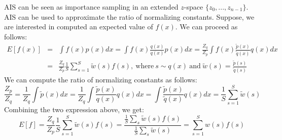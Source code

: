 AIS can be seen as importance sampling in an extended $z$-space $\{z_0,...,z_{n-1}\}$.\\

AIS can be used to approximate the ratio of normalizing constants. Suppose, we are interested in computed an expected value of $f(x)$. We can proceed as follows:
\begin{eqnarray}
    E[f(x)] &=& \int f(x)p(x)dx = \int f(x)\frac{q(x)}{q(x)}p(x)dx = \frac{Z_q}{Z_p}\int f(x)\frac{\tilde{p}(x)}{\tilde{q}(x)}q(x)dx \nonumber \\
    &=& \frac{Z_q}{Z_p}\frac{1}{S}\sum_{s=1}^{S}\tilde{w}(s)f(s),~\mathrm{where}~s\sim q(x)~\mathrm{and}~\tilde{w}(s) = \frac{\tilde{p}(s)}{\tilde{q}(s)}
\end{eqnarray}
We can compute the ratio of normalizing constants as follows:
\begin{equation}
    \frac{Z_p}{Z_q} = \frac{1}{Z_q}\int \tilde{p}(x)dx = \frac{1}{Z_q}\int \frac{\tilde{p}(x)}{q(x)}q(x)dx = \int \frac{\tilde{p}(x)}{\tilde{q}(x)}q(x)dx = \frac{1}{S}\sum_{s=1}^{S}\tilde{w}(s)
\end{equation}
Combining the two expression above, we get:
\begin{equation}
    E[f] = \frac{Z_q}{Z_p}\frac{1}{S}\sum_{s=1}^{S}\tilde{w}(s)f(s) = \frac{\frac{1}{S}\sum_s \tilde{w}(s)f(s)}{\frac{1}{S}\sum_s \tilde{w}(s)} = \sum_{s=1}^{S}w(s)f(s)
\end{equation}

